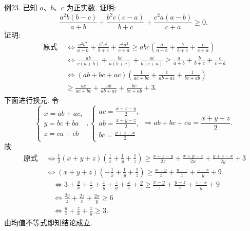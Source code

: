 例23. 已知 $a 、 b 、 c$ 为正实数.
证明:
$$
\frac{a^2 b(b-c)}{a+b}+\frac{b^2 c(c-a)}{b+c}+\frac{c^2 a(a-b)}{c+a} \geqslant 0 .
$$
证明:$$
\begin{aligned}
\text { 原式 } & \Leftrightarrow \frac{a^2 b^2}{a+b}+\frac{b^2 c^2}{b+c}+\frac{c^2 a^2}{c+a} \geqslant a b c\left(\frac{a}{a+b}+\frac{b}{b+c}+\frac{c}{c+a}\right) \\
& \Leftrightarrow \frac{a b}{c(a+b)}+\frac{b c}{a(b+c)}+\frac{a c}{b(c+a)} \geqslant \frac{a}{a+b}+\frac{b}{b+c}+\frac{c}{c+a} \\
& \Leftrightarrow(a b+b c+a c)\left(\frac{1}{a c+b c}+\frac{1}{a b+a c}+\frac{1}{b c+a b}\right) \\
& \geqslant \frac{a c}{a c+b c}+\frac{a b}{a b+a c}+\frac{b c}{b c+a b}+3 .
\end{aligned}
$$
下面进行换元.
令
$$
\left\{\begin{array}{l}
x=a b+a c, \\
y=b c+b a \\
z=c a+c b
\end{array},\left\{\begin{array}{l}
a c=\frac{x+z-y}{2}, \\
a b=\frac{x+y-z}{2}, \\
b c=\frac{y+z-x}{2}
\end{array} \Rightarrow a b+b c+c a=\frac{x+y+z}{2} .\right.\right.
$$
故
$$
\begin{aligned}
\text { 原式 } & \Leftrightarrow \frac{1}{2}(x+y+z)\left(\frac{1}{x}+\frac{1}{y}+\frac{1}{z}\right) \geqslant \frac{x+z-y}{2 z}+\frac{x+y-z}{2 x}+\frac{y+z-x}{2 y}+3 \\
& \Leftrightarrow(x+y+z)\left(-\frac{1}{x}+\frac{1}{y}+\frac{1}{z}\right) \geqslant \frac{x-y}{z}+\frac{y-z}{x}+\frac{z-x}{y}+9
\end{aligned}
$$
$$
\begin{aligned}
& \Leftrightarrow 3+\frac{y}{x}+\frac{z}{x}+\frac{x}{y}+\frac{z}{y}+\frac{x}{z}+\frac{y}{z} \geqslant \frac{x-y}{z}+\frac{y-z}{x}+\frac{z-x}{y}+9 \\
& \Leftrightarrow \frac{2 y}{z}+\frac{2 z}{x}+\frac{2 x}{y} \geqslant 6 \\
& \Leftrightarrow \frac{y}{z}+\frac{z}{x}+\frac{x}{y} \geqslant 3 .
\end{aligned}
$$
由均值不等式即知结论成立.



